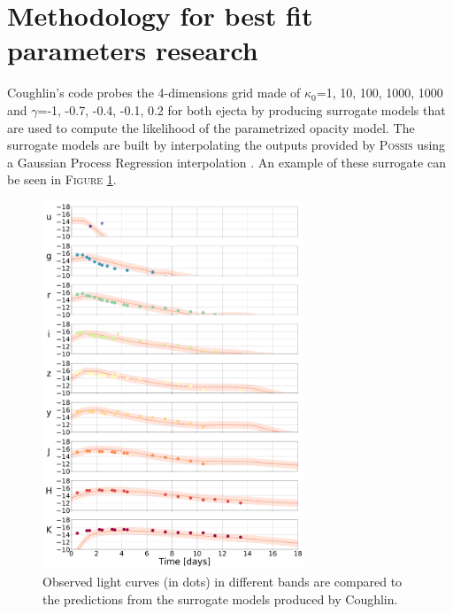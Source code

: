 \documentclass[a4paper, twoside, 11pt]{article}
\numberwithin{equation}{section}
\begin{document}
\section{Methodology for best fit parameters research}
\label{appendix:corner_plots}

\hspace{\parindent} Coughlin's code probes the 4-dimensions grid made of $\kappa_0$=1, 10, 100, 1000, 1000 and $\gamma$=-1, -0.7, -0.4, -0.1, 0.2 for both ejecta by producing surrogate models that are used to compute the likelihood of the parametrized opacity model. 
The surrogate models are built by interpolating the outputs provided by P\textsc{ossis} using a Gaussian Process Regression interpolation \cite{GPR}. An example of these surrogate can be seen in F\textsc{igure} \ref{fig:LCmodelsGrid}. \\
\begin{figure}[h!]
\includegraphics[width=0.7\textwidth]{pictures/models_panels.pdf}
\caption[Light curves predictions compared to observed light curves]{Observed light curves (in dots) in different bands are compared to the predictions from the surrogate models produced by Coughlin.}
\label{fig:LCmodelsGrid}
\end{figure}
\clearpage
\end{document}
